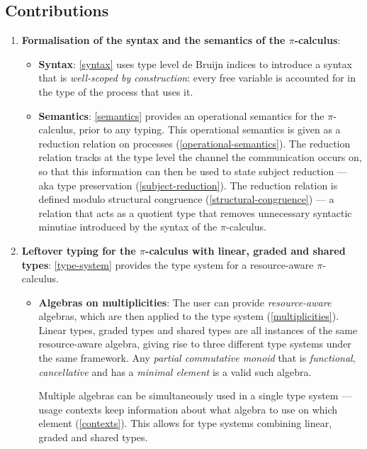 \documentclass[a4paper,UKenglish,cleveref,autoref,thm-restate,authorcolumns]{lipics-v2019}
\theoremstyle{definition}
\newcommand{\picalc}{$\pi$-calculus}
\begin{document}
\subsection{Contributions}
\begin{enumerate}
\item \textbf{Formalisation of the syntax and the semantics of the \picalc{}}:
 \begin{itemize}
   \item \textbf{Syntax}: \autoref{syntax} uses type level de Bruijn indices \cite{deBruijn1972, Dybjer1994} to introduce a syntax that is \emph{well-scoped by construction}: every free variable is accounted for in the type of the process that uses it.
   
   \item \textbf{Semantics}: \autoref{semantics} provides an operational semantics for the \picalc{}, prior to any typing.
   This operational semantics is given as a reduction relation on processes (\autoref{operational-semantics}).
   The reduction relation tracks at the type level the channel the communication occurs on, so that this information can then be used to state subject reduction --- aka type preservation (\autoref{subject-reduction}).
   The reduction relation is defined modulo structural congruence (\autoref{structural-congruence}) --- a relation that acts as a quotient type that removes unnecessary syntactic minutiae introduced by the syntax of the \picalc{}.
 \end{itemize}
  
  \item \textbf{Leftover typing for the \picalc{} with linear, graded and shared types}:
  \autoref{type-system} provides the type system for a resource-aware \picalc{}.
  \begin{itemize}
    \item \textbf{Algebras on multiplicities}: The user can provide \emph{resource-aware} algebras, which are then applied to the type system (\autoref{multiplicities}).
    Linear types, graded types and shared types are all instances of the same resource-aware algebra, giving rise to three different type systems under the same framework.
    Any \emph{partial commutative monoid} that is \emph{functional}, \emph{cancellative} and has a \emph{minimal element} is a valid such algebra.
    
    Multiple algebras can be simultaneously used in a single type system --- usage contexts keep information about what algebra to use on which element (\autoref{contexts}).
    This allows for type systems combining linear, graded and shared types.
    

\end{itemize}
\end{enumerate}
\end{document}
